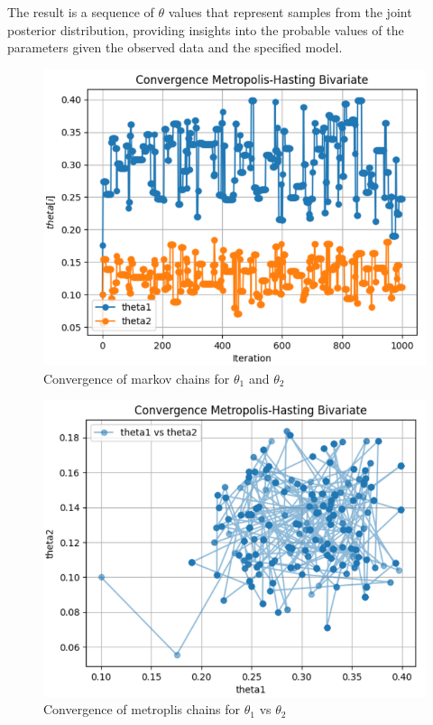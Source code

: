 The result is a sequence of \( \theta \) values that represent samples from the joint posterior distribution, providing insights into the probable values of the parameters given the observed data and the specified model.

\begin{figure}[htbp]
    \centering
    \includegraphics[width=\linewidth]{plots/output_bivar1.png}
    \caption{Convergence of markov chains for \( \theta_1 \) and \( \theta_2 \)}
    \label{fig:my_label}
\end{figure}
\begin{figure}[htbp]
    \centering
    \includegraphics[width=\linewidth]{plots/output_bivar2.png}
    \caption{Convergence of metroplis chains for \( \theta_1 \) vs \( \theta_2 \)}
    \label{fig:my_label}
\end{figure}


